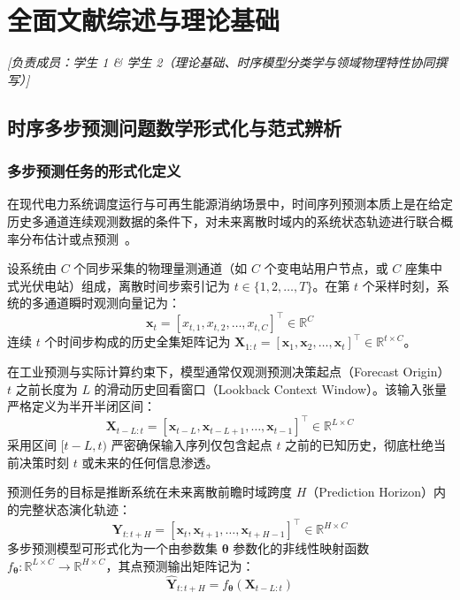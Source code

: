 \section{全面文献综述与理论基础}
\label{sec:literature_review_zh}
\noindent\textit{[负责成员：学生 1 \& 学生 2（理论基础、时序模型分类学与领域物理特性协同撰写）]}

\subsection{时序多步预测问题数学形式化与范式辨析}
\label{subsec:formulation_zh}

\subsubsection{多步预测任务的形式化定义}
在现代电力系统调度运行与可再生能源消纳场景中，时间序列预测本质上是在给定历史多通道连续观测数据的条件下，对未来离散时域内的系统状态轨迹进行联合概率分布估计或点预测~\cite{godahewa2021monash, box2015time}。

设系统由 $C$ 个同步采集的物理量测通道（如 $C$ 个变电站用户节点，或 $C$ 座集中式光伏电站）组成，离散时间步索引记为 $t \in \{1, 2, \dots, T\}$。在第 $t$ 个采样时刻，系统的多通道瞬时观测向量记为：
\begin{equation}
    \mathbf{x}_t = [x_{t, 1}, x_{t, 2}, \dots, x_{t, C}]^\top \in \mathbb{R}^C
\end{equation}
连续 $t$ 个时间步构成的历史全集矩阵记为 $\mathbf{X}_{1:t} = [\mathbf{x}_1, \mathbf{x}_2, \dots, \mathbf{x}_t]^\top \in \mathbb{R}^{t \times C}$。

在工业预测与实际计算约束下，模型通常仅观测预测决策起点（Forecast Origin）$t$ 之前长度为 $L$ 的滑动历史回看窗口（Lookback Context Window）。该输入张量严格定义为半开半闭区间：
\begin{equation}
    \mathbf{X}_{t-L:t} = [\mathbf{x}_{t-L}, \mathbf{x}_{t-L+1}, \dots, \mathbf{x}_{t-1}]^\top \in \mathbb{R}^{L \times C}
\end{equation}
采用区间 $[t-L, t)$ 严密确保输入序列仅包含起点 $t$ 之前的已知历史，彻底杜绝当前决策时刻 $t$ 或未来的任何信息渗透。

预测任务的目标是推断系统在未来离散前瞻时域跨度 $H$（Prediction Horizon）内的完整状态演化轨迹：
\begin{equation}
    \mathbf{Y}_{t:t+H} = [\mathbf{x}_{t}, \mathbf{x}_{t+1}, \dots, \mathbf{x}_{t+H-1}]^\top \in \mathbb{R}^{H \times C}
\end{equation}
多步预测模型可形式化为一个由参数集 $\boldsymbol{\theta}$ 参数化的非线性映射函数 $f_{\boldsymbol{\theta}}: \mathbb{R}^{L \times C} \to \mathbb{R}^{H \times C}$，其点预测输出矩阵记为：
\begin{equation}
    \hat{\mathbf{Y}}_{t:t+H} = f_{\boldsymbol{\theta}}(\mathbf{X}_{t-L:t})
\end{equation}

